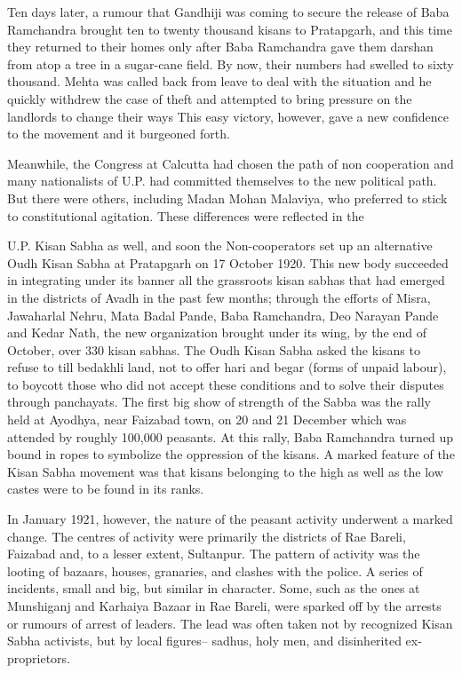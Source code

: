 \begin{multicols}{2}
Ten days later, a rumour that Gandhiji was coming to secure the release of Baba Ramchandra brought ten to twenty thousand kisans to Pratapgarh, and this time they returned to their homes only after Baba Ramchandra gave them darshan from atop a tree in a sugar-cane field. By now, their numbers had swelled to sixty thousand. Mehta was called back from leave to deal with the situation and he quickly withdrew the case of theft and attempted to bring pressure on the landlords to change their ways This easy victory, however, gave a new confidence to the movement and it burgeoned forth.

Meanwhile, the Congress at Calcutta had chosen the path of non cooperation and many nationalists of U.P. had committed themselves to the new political path. But there were others, including Madan Mohan Malaviya, who preferred to stick to constitutional agitation. These differences were reflected in the

U.P. Kisan Sabha as well, and soon the Non-cooperators set up an alternative Oudh Kisan Sabha at Pratapgarh on 17 October 1920. This new body succeeded in integrating under its banner all the grassroots kisan sabhas that had emerged in the districts of Avadh in the past few months; through the efforts of Misra, Jawaharlal Nehru, Mata Badal Pande, Baba Ramchandra, Deo Narayan Pande and Kedar Nath, the new organization brought under its wing, by the end of October, over 330 kisan sabhas. The Oudh Kisan Sabha asked the kisans to refuse to till bedakhli land, not to offer hari and begar (forms of unpaid labour), to boycott those who did not accept these conditions and to solve their disputes through panchayats. The first big show of strength of the Sabba was the rally held at Ayodhya, near Faizabad town, on 20 and 21 December which was attended by roughly 100,000 peasants. At this rally, Baba Ramchandra turned up bound in ropes to symbolize the oppression of the kisans. A marked feature of the Kisan Sabha movement was that kisans belonging to the high as well as the low castes were to be found in its ranks.

In January 1921, however, the nature of the peasant activity underwent a marked change. The centres of activity were primarily the districts of Rae Bareli, Faizabad and, to a lesser extent, Sultanpur. The pattern of activity was the looting of bazaars, houses, granaries, and clashes with the police. A series of incidents, small and big, but similar in character. Some, such as the ones at Munshiganj and Karhaiya Bazaar in Rae Bareli, were sparked off by the arrests or rumours of arrest of leaders. The lead was often taken not by recognized Kisan Sabha activists, but by local figures-- sadhus, holy men, and disinherited ex- proprietors.


\end{multicols}
